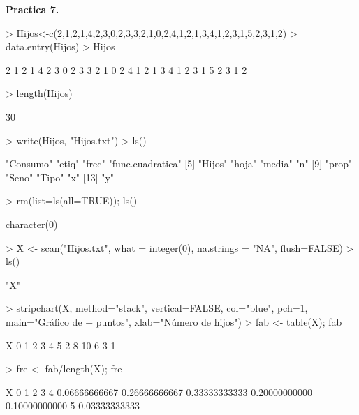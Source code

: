 \documentclass{article}
\begin{document}
\textbf{Practica 7.}


\begin{Schunk}
\begin{Sinput}
> Hijos<-c(2,1,2,1,4,2,3,0,2,3,3,2,1,0,2,4,1,2,1,3,4,1,2,3,1,5,2,3,1,2)
> data.entry(Hijos)
> Hijos
\end{Sinput}
\begin{Soutput}
 [1] 2 1 2 1 4 2 3 0 2 3 3 2 1 0 2 4 1 2 1 3 4 1 2 3 1 5 2 3 1 2
\end{Soutput}
\begin{Sinput}
> length(Hijos)
\end{Sinput}
\begin{Soutput}
[1] 30
\end{Soutput}
\begin{Sinput}
> write(Hijos, "Hijos.txt")
> ls()
\end{Sinput}
\begin{Soutput}
 [1] "Consumo"         "etiq"            "frec"            "func.cuadratica"
 [5] "Hijos"           "hoja"            "media"           "n"              
 [9] "prop"            "Seno"            "Tipo"            "x"              
[13] "y"              
\end{Soutput}
\begin{Sinput}
> rm(list=ls(all=TRUE)); ls()
\end{Sinput}
\begin{Soutput}
character(0)
\end{Soutput}
\begin{Sinput}
> X <- scan("Hijos.txt", what = integer(0), na.strings = "NA", flush=FALSE)
> ls()
\end{Sinput}
\begin{Soutput}
[1] "X"
\end{Soutput}
\begin{Sinput}
> stripchart(X, method="stack", vertical=FALSE, col="blue", pch=1, main="Gráfico de\n
+ puntos", xlab="Número de hijos")
> fab <- table(X); fab
\end{Sinput}
\begin{Soutput}
X
 0  1  2  3  4  5 
 2  8 10  6  3  1 
\end{Soutput}
\begin{Sinput}
> fre <- fab/length(X); fre
\end{Sinput}
\begin{Soutput}
X
            0             1             2             3             4 
0.06666666667 0.26666666667 0.33333333333 0.20000000000 0.10000000000 
            5 
0.03333333333 
\end{Soutput}

\end{Schunk}
\end{document}
